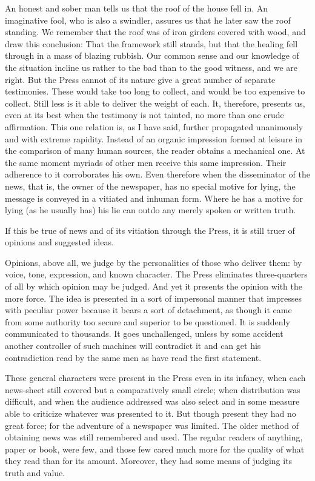 \documentclass{book}
\begin{document}
An honest and sober man tells us that the roof of the house fell in. An imaginative fool, who is also a swindler, assures us that he later saw the roof standing. We remember that the roof was of iron girders covered with wood, and draw this conclusion: That the framework still stands, but that the healing fell through in a mass of blazing rubbish. Our common sense and our knowledge of the situation incline us rather to the bad than to the good witness, and we are right. But the Press cannot of its nature give a great number of separate testimonies. These would take too long to collect, and would be too expensive to collect. Still less is it able to deliver the weight of each. It, therefore, presents us, even at its best when the testimony is not tainted, no more than one crude affirmation. This one relation is, as I have said, further propagated unanimously and with extreme rapidity. Instead of an organic impression formed at leisure in the comparison of many human sources, the reader obtains a mechanical one. At the same moment myriads of other men receive this same impression. Their adherence to it corroborates his own. Even therefore when the disseminator of the news, that is, the owner of the newspaper, has no special motive for lying, the message is conveyed in a vitiated and inhuman form. Where he has a motive for lying (as he usually has) his lie can outdo any merely spoken or written truth.

If this be true of news and of its vitiation through the Press, it is still truer of opinions and suggested ideas.

Opinions, above all, we judge by the personalities of those who deliver them: by voice, tone, expression, and known character. The Press eliminates three-quarters of all by which opinion may be judged. And yet it presents the opinion with the more force. The idea is presented in a sort of impersonal manner that impresses with peculiar power because it bears a sort of detachment, as though it came from some authority too secure and superior to be questioned. It is suddenly communicated to thousands. It goes unchallenged, unless by some accident another controller of such machines will contradict it and can get his contradiction read by the same men as have read the first statement.

These general characters were present in the Press even in its infancy, when each news-sheet still covered but a comparatively small circle; when distribution was difficult, and when the audience addressed was also select and in some measure able to criticize whatever was presented to it. But though present they had no great force; for the adventure of a newspaper was limited. The older method of obtaining news was still remembered and used. The regular readers of anything, paper or book, were few, and those few cared much more for the quality of what they read than for its amount. Moreover, they had some means of judging its truth and value.
\end{document}
